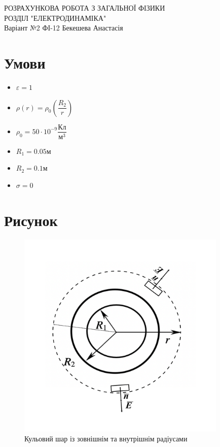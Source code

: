 \documentclass[a4paper,12pt]{article}
\begin{document}
 \begin{justify}
 \thispagestyle{empty}\setlength{\parindent}{0pt}
 \vspace*{\fill}
  \begin{center}
  \noindent\makebox[\linewidth]{\rule{\paperwidth}{0.4pt}}
   \LARGE{\bigbreak РОЗРАХУНКОВА РОБОТА З ЗАГАЛЬНОЇ ФІЗИКИ\\РОЗДІЛ "ЕЛЕКТРОДИНАМІКА"\\Варіант №2\bigbreak} 
   ФІ-12 Бекешева Анастасія 
   \noindent\makebox[\linewidth]{\rule{\paperwidth}{0.4pt}}
  \end{center}
 \vspace*{\fill}\newpage
 \section{Умови}
 \begin{itemize}
  \item $\varepsilon=1$
  \item $\rho(r)=\rho_0\left(\dfrac{R_2}{r}\right)$
  \item $\rho_0=50\cdot10^{-9}\dfrac{\textrm{Кл}}{\textrm{м}^3}$
  \item $R_1=0.05\textrm{м}$
  \item $R_2=0.1\textrm{м}$
  \item $\sigma=0$
 \end{itemize}
 \section{Рисунок}
 \begin{figure}[!h]
    \centering
    \includegraphics[width=10cm]{media/cw_graph1}
    \caption{Кульовий шар із зовнішнім та внутрішнім радіусами}
    \label{fig:1}
 \end{figure}

\end{justify}
\end{document}
